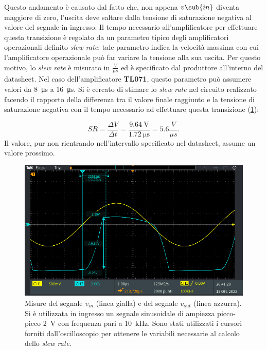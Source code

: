 Questo andamento è causato dal fatto che, non appena $v\sub{in}$ diventa maggiore di zero, l'uscita deve saltare dalla tensione di saturazione negativa al valore del segnale in ingresso. Il tempo necessario all'amplificatore per effettuare questa transizione è regolato da un parametro tipico degli amplificatori operazionali definito \textit{slew rate}: tale parametro indica la velocità massima con cui l'amplificatore operazionale può far variare la tensione alla sua uscita. Per questo motivo, lo \textit{slew rate} è misurato in $\frac{V}{\mu s}$ ed è specificato dal produttore all'interno del datasheet. Nel caso dell'amplificatore \textbf{TL071}, questo parametro può assumere valori da \SI{8}{\micro\second} a \SI{16}{\micro\second}. Si è cercato di stimare lo \textit{slew rate} nel circuito realizzato facendo il rapporto della differenza tra il valore finale raggiunto e la tensione di saturazione negativa con il tempo necessario ad effettuare questa transizione (\Fig\ref{fig:slewratevolt}):

\begin{equation}
	SR=\frac{\Delta V}{\Delta t}=\frac{\SI{9.64}{\volt}}{\SI{1.72}{\micro\second}}=5. 6\frac{V}{\mu s}.
\end{equation}
Il valore, pur non rientrando nell'intervallo specificato nel datasheet, assume un valore prossimo.
\begin{figure}[tbh]
	\centering
	\includegraphics[width=\linewidth]{./ImageFiles/Laboratorio 2/TEK00040.PNG}
	\caption{Misure del segnale $v_{in}$ (linea gialla) e del segnale $v_{out}$ (linea azzurra). Si è utilizzata in ingresso un segnale sinusoidale di ampiezza picco-picco \SI{2}{\volt} con frequenza pari a \SI{10}{\kilo\hertz}. Sono stati utilizzati i cursori forniti dall'oscilloscopio per ottenere le variabili necessarie al calcolo dello \textit{slew rate}.}
	\label{fig:slewratevolt}
\end{figure}

